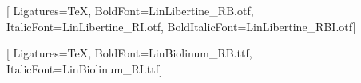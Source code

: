 %
%
%





\setlength{\textwidth}{146.8mm} %
\setlength{\oddsidemargin}{11.6mm} %
\setlength{\evensidemargin}{0.8mm} %
\setlength{\topmargin}{-2.2mm} %
\setlength{\textheight}{221.9mm} %
\setlength{\headheight}{14pt}


\usepackage{mathpazo}
\usepackage{fontspec}
\setmainfont{LinLibertine_R.otf}[%
  Ligatures=TeX,%
  BoldFont=LinLibertine_RB.otf,%
  ItalicFont=LinLibertine_RI.otf,%
  BoldItalicFont=LinLibertine_RBI.otf]

\setsansfont{LinBiolinum_R.ttf}[%
    Ligatures=TeX,%
    BoldFont=LinBiolinum_RB.ttf,%
    ItalicFont=LinBiolinum_RI.ttf]

\usepackage{polyglossia}
\setmainlanguage{english}



\setlength{\parindent}{0pt}

\usepackage{setspace} %

